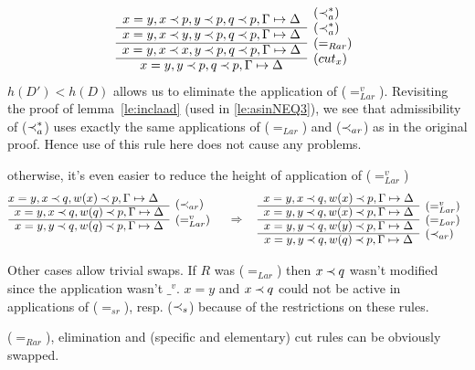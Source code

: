 \begin{PROOF}
\begin{LS}
\begin{LSA}
\begin{LSB}
\[\begin{array}{cl}
x=y, x\Incl p, y\Incl p, q\Incl p, \GSD & \raisebox{1.2ex}[1.5ex][0ex]{($\Incl_a^*$)} \\ \cline{1-1}
x=y, x\Incl y, y\Incl p, q\Incl p, \GSD & \raisebox{1.2ex}[1.5ex][0ex]{($\Incl_a^*$)} \\ \cline{1-1}
x=y, x\Incl x, y\Incl p, q\Incl p, \GSD & \raisebox{1.2ex}[1.5ex][0ex]{($=_{Rar}$)} \\ \cline{1-1}
x=y, y\Incl p, q\Incl p, \GSD & \raisebox{1.2ex}[1.5ex][0ex]{($cut_x$)} 
\end{array}
\]
$h(D')<h(D)$ allows us to eliminate the application of ($=_{Lar}^v$). Revisiting the proof
of lemma~\ref{le:inclaad} (used in \ref{le:asinNEQ3}), we see that admissibility of 
($\mathbin{\prec}_a^*$) uses exactly the same applications of
($=_{Lar}$) and ($\mathbin{\prec}_{ar}$) as in the original proof. Hence use of this rule here does not
cause any problems.
\item otherwise, it's even easier to reduce the height of application of ($=_{Lar}^v$)
\[ \begin{array}{cl} \hspace*{-1em}
x=y, x\Incl q, w(x)\Incl p,\GSD  &\raisebox{-1.2ex}[1.5ex][0ex]{($\Incl_{ar}$)}\\ \cline{1-1}
x=y, x\Incl q, w(q)\Incl p, \GSD &  \\ \cline{1-1}
x=y, y\Incl q, w(q)\Incl p, \GSD & \raisebox{1.2ex}[1.5ex][0ex]{($=_{Lar}^v$)} \\  \ 
\end{array}
\conv
\begin{array}{cl}
x=y, x\Incl q, w(x)\Incl p,\GSD  \\ \cline{1-1}
x=y, y\Incl q, w(x)\Incl p,\GSD  & \raisebox{1.2ex}[1.5ex][0ex]{($=_{Lar}^v$)} \\ \cline{1-1}
x=y, y\Incl q, w(y)\Incl p,\GSD  & \raisebox{1.2ex}[1.5ex][0ex]{($=_{Lar}$)} \\ \cline{1-1}
x=y, y\Incl q, w(q)\Incl p,\GSD  & \raisebox{1.2ex}[1.5ex][0ex]{($\Incl_{ar}$)} 
\end{array}
\]
\end{LSB}
\item\label{caseAB} 
Other cases allow trivial swaps. If $R$ was ($=_{Lar}$) then $x\mathbin{\prec} q$ wasn't modified
since the application wasn't $\_^v$. 
$x=y$ and $x\mathbin{\prec} q$ could not be active in 
applications of ($=_{sr}$), resp. ($\mathbin{\prec}_s$) because of the restrictions on these rules.

($=_{Rar}$), elimination and (specific and elementary) cut rules can be obviously swapped.
\end{LSA}


\end{LS}
\end{PROOF}
